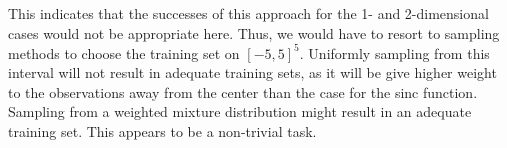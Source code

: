 \documentclass[paper=a4, fontsize=11pt]{scrartcl} %
\numberwithin{equation}{section} %
\begin{document}
This indicates that the successes of this approach for the 1- and 2-dimensional cases would not be appropriate here. Thus, we would have to resort to sampling methods to choose the training set on $[-5,5]^5$. Uniformly sampling from this interval will not result in adequate  training sets, as it will be give higher weight to the observations away from the center than the case for the sinc function. Sampling from a weighted mixture distribution might result in an adequate training set. This appears to be a non-trivial task.

\begin{comment}
\begin{table}
\centering
\begin{tabular}{|c|c|c|}
\hline
Hidden units & Training Set & Test sets \\ 
\hline
100 & 	0.0014	& 0.0014 \\
\hline
200 & 	& \\
\hline
300 & 	& 	\\
\hline
400 & 	& \\
\hline
500	& 	& \\
\hline
\end{tabular}
\caption{MSE of the network on the test set for the sinc function in 5 dimensions.}
\label{sinc5}
\end{table}
\end{comment}

\begin{comment}
\section{Appendix (MATLAB Code)}
\subsection*{Session 1}

\end{comment}

\end{document}
